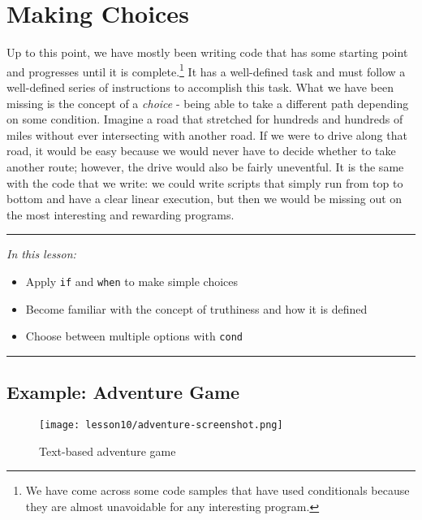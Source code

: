 \documentclass[10pt,twoside,openright]{memoir}
\begin{document}
\chapter{Making Choices}

Up to this point, we have mostly been writing code that has some
starting point and progresses until it is complete.\footnote{We have
  come across some code samples that have used conditionals because they
  are almost unavoidable for any interesting program.} It has a
well-defined task and must follow a well-defined series of instructions
to accomplish this task. What we have been missing is the concept of a
\emph{choice} - being able to take a different path depending on some
condition. Imagine a road that stretched for hundreds and hundreds of
miles without ever intersecting with another road. If we were to drive
along that road, it would be easy because we would never have to decide
whether to take another route; however, the drive would also be fairly
uneventful. It is the same with the code that we write: we could write
scripts that simply run from top to bottom and have a clear linear
execution, but then we would be missing out on the most interesting and
rewarding programs.

\begin{center}\rule{0.5\linewidth}{0.5pt}\end{center}

\emph{In this lesson:}

\begin{itemize}
\tightlist
\item
  Apply \texttt{if} and \texttt{when} to make simple choices
\item
  Become familiar with the concept of truthiness and how it is defined
\item
  Choose between multiple options with \texttt{cond}
\end{itemize}

\begin{center}\rule{0.5\linewidth}{0.5pt}\end{center}


\section{Example: Adventure Game}

\begin{figure}[H]
\caption{Text-based adventure game}
\centering
\texttt{[image: lesson10/adventure-screenshot.png]}
\end{figure}
\end{document}
